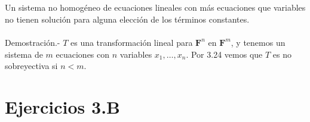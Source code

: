 \setcounter{myteo}{28}
\begin{myteo}\,\\\\
    Un sistema no homogéneo de ecuaciones lineales con más ecuaciones que variables no tienen solución para alguna elección de los términos constantes.\\\\
	Demostración.-\; $T$ es una transformación lineal para $\textbf{F}^n$ en $\textbf{F}^m$, y tenemos un sistema de $m$ ecuaciones con $n$ variables $x_1,\ldots,x_n$. Por 3.24 vemos que $T$ es no sobreyectiva si $n<m$.
\end{myteo}


\section*{Ejercicios 3.B}

